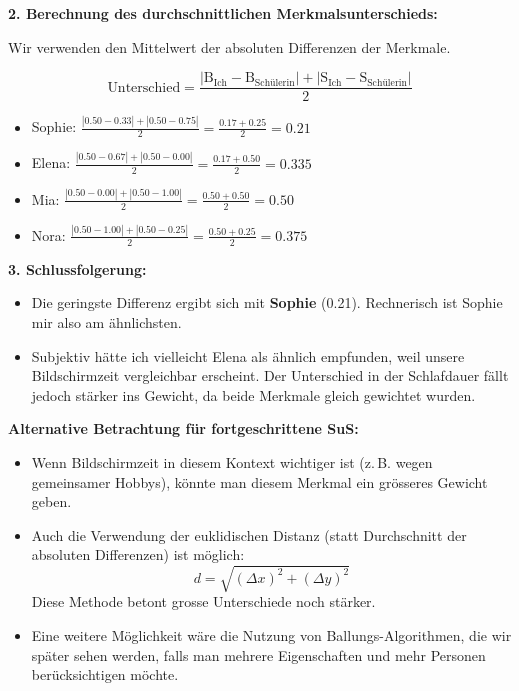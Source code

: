 \begin{aufgabe}{5}
\vspace{1em}
\textbf{2. Berechnung des durchschnittlichen Merkmalsunterschieds:}

Wir verwenden den Mittelwert der absoluten Differenzen der Merkmale.

\[
\text{Unterschied} = \frac{|\text{B}_{\text{Ich}} - \text{B}_{\text{Schülerin}}| + |\text{S}_{\text{Ich}} - \text{S}_{\text{Schülerin}}|}{2}
\]

\begin{itemize}
  \item Sophie: $\frac{|0.50 - 0.33| + |0.50 - 0.75|}{2} = \frac{0.17 + 0.25}{2} = 0.21$
  \item Elena: $\frac{|0.50 - 0.67| + |0.50 - 0.00|}{2} = \frac{0.17 + 0.50}{2} = 0.335$
  \item Mia: $\frac{|0.50 - 0.00| + |0.50 - 1.00|}{2} = \frac{0.50 + 0.50}{2} = 0.50$
  \item Nora: $\frac{|0.50 - 1.00| + |0.50 - 0.25|}{2} = \frac{0.50 + 0.25}{2} = 0.375$
\end{itemize}

\vspace{1em}
\textbf{3. Schlussfolgerung:}

\begin{itemize}
  \item Die geringste Differenz ergibt sich mit \textbf{Sophie} (0.21). Rechnerisch ist Sophie mir also am ähnlichsten.
  \item Subjektiv hätte ich vielleicht Elena als ähnlich empfunden, weil unsere Bildschirmzeit vergleichbar erscheint. Der Unterschied in der Schlafdauer fällt jedoch stärker ins Gewicht, da beide Merkmale gleich gewichtet wurden.
\end{itemize}

\vspace{1em}
\textbf{Alternative Betrachtung für fortgeschrittene SuS:}

\begin{itemize}
  \item Wenn Bildschirmzeit in diesem Kontext wichtiger ist (z.\,B. wegen gemeinsamer Hobbys), könnte man diesem Merkmal ein grösseres Gewicht geben.
  \item Auch die Verwendung der euklidischen Distanz (statt Durchschnitt der absoluten Differenzen) ist möglich:
  \[
  d = \sqrt{(\Delta x)^2 + (\Delta y)^2}
  \]
  Diese Methode betont grosse Unterschiede noch stärker.
  \item Eine weitere Möglichkeit wäre die Nutzung von Ballungs-Algorithmen, die wir später sehen werden, falls man mehrere Eigenschaften und mehr Personen berücksichtigen möchte.
\end{itemize}

\end{aufgabe}


